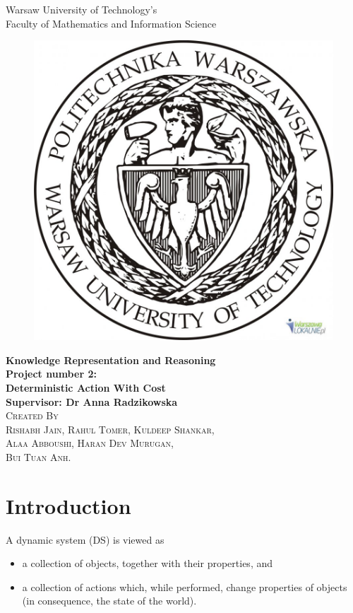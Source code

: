 \documentclass[11pt]{article}
\begin{document}
	\begin{titlepage}
		\begin{center}
			\Large{Warsaw University of Technology's}\\
			\Large{Faculty of Mathematics and Information Science}\\
			[0.3in]
			\begin{figure}[H]
				\centering
				\includegraphics[width=0.4\linewidth, height=0.25\textheight]{./media/uni_logo.jpeg}
				\label{Figure:f04}
			\end{figure}
			\Large{\bfseries Knowledge Representation and Reasoning}\\
			[0.3in]
			\Large{\bfseries Project number 2:}\\
			\Large{\bfseries Deterministic Action With Cost}\\
			\Large{\bfseries Supervisor: Dr Anna Radzikowska}\\
			[0.3in]
			\textsc{\Large{Created By}\\
				Rishabh Jain,
				Rahul Tomer,
				Kuldeep Shankar,\\ 
				Alaa Abboushi,
				Haran Dev Murugan,\\
				Bui Tuan Anh.\\}
		\end{center}	
	\end{titlepage}
	\tableofcontents
	\newpage
	\section{Introduction}\label{sec:intro}
	A dynamic system (DS) is viewed as
	\begin{itemize}
	\item a collection of objects, together with their properties, and
	\item a collection of actions which, while performed, change properties
of objects (in consequence, the state of the world).
	\end{itemize}
\end{document}
